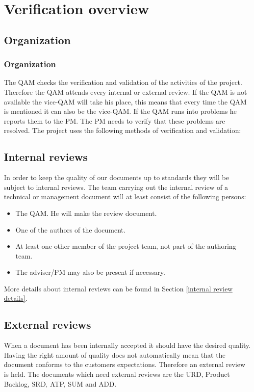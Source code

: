 \documentclass[%
		pathtobase=..,%
		titlefull={Software Validation and Verification Plan},%
		titleabbr=SVVP,%
		version=0.1]{fingerpaint}
\begin{document}



\chapter{Verification overview}
\section{Organization}
\subsection{Organization}
   The QAM checks the verification and validation of the activities of the project. Therefore
   the QAM attends every internal or external review. If the QAM is not available the vice-QAM
   will take his place, this means that every time the QAM is mentioned it can also be the vice-QAM.
   If the QAM runs into problems he reports them to the PM. The PM needs to verify that these
   problems are resolved.
       The project uses the following methods of verification and validation:
\section{Internal reviews} \label{internal review}
   In order to keep the quality of our documents up to standards they will be subject to internal
   reviews.
       The team carrying out the internal review of a technical or management document will at least
   consist of the following persons:
\begin{itemize}
\item The QAM. He will make the review document.
\item One of the authors of the document.
\item At least one other member of the project team, not part of the authoring team.
\item The adviser/PM may also be present if necessary.
\end{itemize}
More details about internal reviews can be found in Section \ref{internal review details}.
\section{External reviews} \label{external review}
When a document has been internally accepted it should have the desired quality. Having the right amount of quality does not automatically mean that the document conforms to the customers expectations. Therefore an external review is held. The documents which need external reviews are the URD, Product Backlog, SRD, ATP, SUM and ADD.
\end{document}

